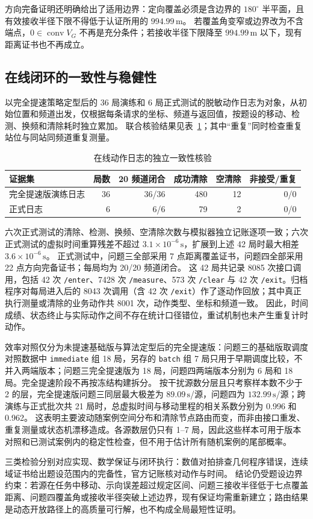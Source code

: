 方向完备证明还明确给出了适用边界：定向覆盖必须是含边界的 $180^\circ$ 半平面，且有效接收半径下限不得低于认证所用的
$994.99\,\mathrm m$。
若覆盖角变窄或边界改为不含端点，$0\in\operatorname{conv}V_G$ 不再是充分条件；若接收半径下限降至
$994.99\,\mathrm m$ 以下，现有距离证书也不再成立。

\subsection{在线闭环的一致性与稳健性}

以完全提速策略定型后的 36 局演练和 6 局正式测试的脱敏动作日志为对象，从初始位置和频道出发，仅根据每条请求的坐标、频道与返回值，按题设的移动、检测、换频和清除耗时独立累加。
联合核验结果见表~\ref{tab:validation_logs}；其中“重复”同时检查重复站位与同站同频道重复测量。

\begin{table}[htbp]
\centering
\caption{在线动作日志的独立一致性核验}
\label{tab:validation_logs}
\small
\begin{tabular}{lrrrrr}
\toprule
证据集 & 局数 & 20 频道闭合 & 成功清除 & 空清除 & 非接受/重复 \\
\midrule
完全提速版演练日志 & 36 & 36/36 & 480 & 12 & 0/0 \\
正式日志 & 6 & 6/6 & 79 & 2 & 0/0 \\
\bottomrule
\end{tabular}
\end{table}

六次正式测试的清除、检测、换频、空清除次数与模拟器独立记账逐项一致；六次正式测试的虚拟时间重算残差不超过 $3.1\times10^{-6}\,\mathrm s$，扩展到上述 42 局时最大相差 $3.6\times10^{-6}\,\mathrm s$。
正式测试中，问题三全部采用 7 点距离覆盖证书，问题四全部采用 22 点方向完备证书；每局均为 20/20 频道闭合。
这 42 局共记录 8085 次接口调用，包括 42 次 \texttt{/enter}、7428 次 \texttt{/measure}、573 次 \texttt{/clear} 与 42 次 \texttt{/exit}。归档程序对每局进入后的 8043 次调用（含 42 次 \texttt{/exit}）作了逐动作回放；其中真正执行测量或清除的业务动作共 8001 次，动作类型、坐标和频道一致。
因此，时间成绩、状态终止与实际动作之间不存在统计口径错位，重试机制也未产生重复计时动作。

效率对照仅分为未提速基础版与算法定型后的完全提速版：问题三的基础版取调度对照数据中 \texttt{immediate} 组 18 局，另存的 \texttt{batch} 组 7 局只用于早期调度比较，不并入两端版本；问题三完全提速版为 18 局，问题四两端版本分别为 6 局和 18 局。完全提速阶段不再按冻结构建拆分。
按干扰源数分层且只考察样本数不少于 2 的层，完全提速版问题三同层最大极差为 $89.09\,\mathrm s$/源，问题四为 $132.99\,\mathrm s$/源；跨演练与正式批次共 21 局时，总虚拟时间与移动里程的相关系数分别为 0.996 和 0.962。
这表明主要波动随案例空间分布和清除节点路由而变，而非由接口重发、重复测量或状态机漂移造成。各源数层仍只有 1--7 局，因此这些样本可用于版本对照和已测试案例内的稳定性检查，但不用于估计所有随机案例的尾部概率。

三类检验分别对应实现、数学保证与闭环执行：数值对拍排查几何程序错误，连续域证书给出题设范围内的完备性，官方记账核对动作与时间。
结论仍受题设边界约束：若源在任务中移动、示向误差超过规定区间、问题三接收半径低于七点覆盖距离、问题四覆盖角或接收半径突破上述边界，现有保证均需重新建立；路由结果是动态开放路径上的高质量可行解，也不构成全局最短性证明。
